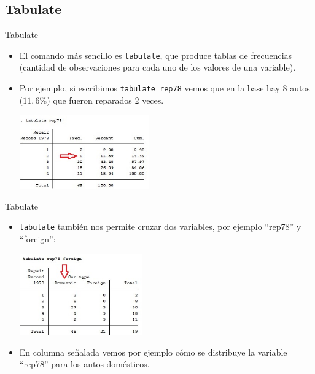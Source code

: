 \documentclass{beamer}
\begin{document}
\subsection{Tabulate}
\begin{frame}{Tabulate}
\begin{itemize}
\item El comando más sencillo es \texttt{tabulate}, que produce tablas de frecuencias (cantidad de observaciones para cada uno de los valores de una variable).
\item Por ejemplo, si escribimos \texttt{tabulate rep78} vemos que en la base hay 8 autos ($11,6\%$) que fueron reparados 2 veces.
\centerline{\includegraphics[height=3.2cm]{tabulate.jpg}}
\end{itemize}
\end{frame}


\begin{frame}{Tabulate}
\begin{itemize}
\item \texttt{tabulate} también nos permite cruzar dos variables, por ejemplo ``rep78'' y ``foreign'':
\centerline{\includegraphics[height=3.5cm]{tabulate1.jpg}}
\item En columna señalada vemos por ejemplo cómo se distribuye la variable ``rep78'' para los autos domésticos.
\end{itemize}
\end{frame}
\end{document}
